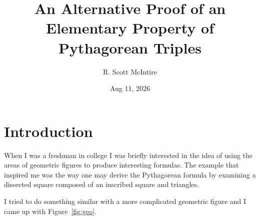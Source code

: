 \documentclass[12pt]{article}
\title{An Alternative Proof of an Elementary Property of Pythagorean Triples}
\author{R. Scott McIntire}
\date{Aug 11, 2026}
\theoremstyle{plain}
\begin{document}
\maketitle

\section{Introduction}
When I was a freshman in college I was briefly interested in the idea of 
using the areas of geometric figures to
produce interesting formulas. The example that inspired me was the way one 
may derive the Pythagorean formula
by examining a dissected square composed of 
an inscribed square and triangles. 

I tried to do something similar with a more complicated geometric figure and 
I came up with Figure~\ref{fig:geo}.
\end{document}
